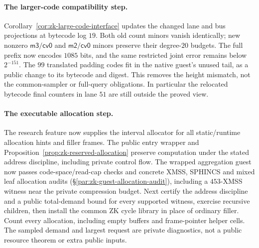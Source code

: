 \paragraph{The larger-code compatibility step.} Corollary~\ref{cor:zk-large-code-interface} updates the changed lane and bus projections at bytecode log $19$. Both old count minors vanish identically; new nonzero $\mathsf{m3}/\mathsf{cv0}$ and $\mathsf{m2}/\mathsf{cv0}$ minors preserve their degree-$20$ budgets. The full prefix now encodes $1085$ bits, and the same restricted joint error remains below $2^{-151}$. The $99$ translated padding codes fit in the native guest's unused tail, as a public change to its bytecode and digest. This removes the height mismatch, not the common-sampler or full-query obligations. In particular the relocated bytecode final counters in lane $51$ are still outside the proved view.

\paragraph{The executable allocation step.} The research feature now supplies the interval allocator for all static/runtime allocation hints and filler frames. The public entry wrapper and Proposition~\ref{prop:zk-reserved-allocation} preserve computation under the stated address discipline, including private control flow. The wrapped aggregation guest now passes code-space/read-cap checks and concrete XMSS, SPHINCS and mixed leaf allocation audits (\S\ref{par:zk-guest-allocation-audit}), including a $453$-XMSS witness near the private compression budget. Next certify the address discipline and a public total-demand bound for every supported witness, exercise recursive children, then install the common ZK cycle library in place of ordinary filler. Count every allocation, including empty buffers and frame-pointer helper cells. The sampled demand and largest request are private diagnostics, not a public resource theorem or extra public inputs.

